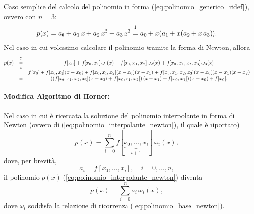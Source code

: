 \begin{example}
	Caso semplice del calcolo del polinomio in forma (\ref{eq:polinomio_generico_ridef}), ovvero con $n=3$:
	\begin{equation*}
		p(x)=a_0+a_1\,x+a_2\,x^2+a_3\,x^3\overset{\footnotemark}{=} a_0+ x(a_1+x(a_2+x\,a_3)).
	\end{equation*}
	Nel caso in cui volessimo calcolare il polinomio tramite la forma di Newton, allora
	\begin{equation*}
		\begin{matrix}
			p(x) &\overset{\footnotemark}{=}& f[x_0] + f[x_0,x_1]\,\omega_1(x) + f[x_0,x_1,x_2]\,\omega_2(x) + f[x_0,x_1,x_2,x_3]\,\omega_3(x)\\
			&\overset{\footnotemark}{=}& f[x_0]+f[x_0,x_1](x-x_0)+f[x_0,x_1,x_2](x-x_0)(x-x_1)+f[x_0,x_1,x_2,x_3](x-x_0)(x-x_1)(x-x_2)\\
			&=&\left(\left(f[x_0,x_1,x_2,x_3](x-x_2) + f[x_0,x_1,x_2]\right)(x-x_1)+f[x_0,x_1]\right)(x-x_0)+f[x_0].
		\end{matrix}
	\end{equation*}
	\addtocounter{footnote}{-1}
	
\end{example}

\paragraph{Modifica Algoritmo di Horner:} Nel caso in cui è ricercata la soluzione del polinomio interpolante in forma di Newton (ovvero di (\ref{eq:polinomio_interpolante_newton}), il quale è riportato)
\begin{equation*}
	p(x) = \sum_{i=0}^{n} f[\underbrace{x_0,\hdots, x_i}_{i+1}]\,\omega_i(x),
\end{equation*}
dove, per brevità,
\begin{equation*}
	a_i = f[x_0, \hdots, x_i],\quad i=0, \hdots, n,
\end{equation*}
il polinomio $p(x)$ (\ref{eq:polinomio_interpolante_newton}) diventa
\begin{equation*}
	p(x)= \sum_{i=0}^{n} a_i\,\omega_i(x),
\end{equation*}
dove $\omega_{i}$ soddisfa la relazione di ricorrenza (\ref{eq:polinomio_base_newton}).

